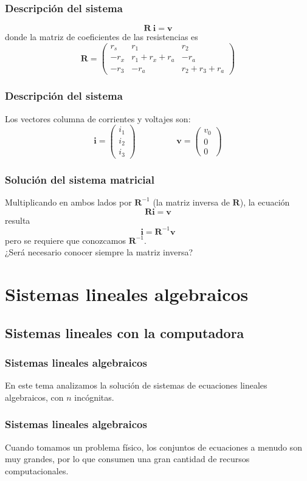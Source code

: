 \begin{frame}
\frametitle{Descripción del sistema}
\[ \mathbf{R \: i} = \mathbf{v}\]
donde la matriz de coeficientes de las resistencias es
\[\mathbf{R} =
\begin{pmatrix}
r_{s} & r_{1} & r_{2} \\
-r_{x} & r_{1} + r_{x} + r_{a} & -r_{a} \\
-r_{3} & -r_{a} & r_{2} + r_{3} + r_{a}
\end{pmatrix} \]
\end{frame}
\begin{frame}
\frametitle{Descripción del sistema}
Los vectores columna de corrientes y voltajes son:
\[ \mathbf{i} =
\begin{pmatrix}
i_{1} \\
i_{2} \\
i_{3}
\end{pmatrix}
\hspace{2cm}
\mathbf{v} =
\begin{pmatrix}
v_{0} \\
0 \\
0
\end{pmatrix} \]
\end{frame}
\begin{frame}
\frametitle{Solución del sistema matricial}
Multiplicando en ambos lados por $\mathbf{R}^{-1}$ (la matriz inversa de $\mathbf{R}$), la ecuación
\[ \mathbf{Ri} = \mathbf{v}\]
resulta
\[ \mathbf{i} = \mathbf{R}^{-1}\mathbf{v}\]
pero se requiere que conozcamos $\mathbf{R}^{-1}$.
\\
\bigskip
\pause
¿Será necesario conocer siempre la matriz inversa?
\end{frame}
\section{Sistemas lineales algebraicos}
\subsection*{Sistemas lineales con la computadora}
\begin{frame}
\frametitle{Sistemas lineales algebraicos}
En este tema analizamos la solución de sistemas de ecuaciones lineales algebraicos, con $n$ incógnitas. 
\end{frame}
\begin{frame}
\frametitle{Sistemas lineales algebraicos}
Cuando tomamos un problema físico, los conjuntos de ecuaciones a menudo son muy grandes, por lo que consumen una gran cantidad de recursos computacionales.
\end{frame}
